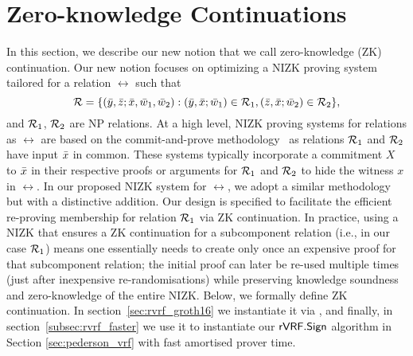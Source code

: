 


\section{Zero-knowledge Continuations}
\label{sec:rvrf_cont}
In this section, we describe our new notion that we call zero-knowledge (ZK) continuation. Our new notion focuses on optimizing a NIZK proving system tailored for a relation $ \rel $ such that
$$\mathcal{R} = \{(\bar{y}, \bar{z}; \bar{x}, \bar{w}_1, \bar{w}_2):  (\bar{y}, \bar{x}; \bar{w}_1) \in \mathcal{R}_1, (\bar{z}, \bar{x}; \bar{w}_2) \in \mathcal{R}_2 \},$$
and $\mathcal{R}_1$, $\mathcal{R}_2$ are NP relations. 
At a high level, NIZK proving systems for relations as $ \rel$ are based on the commit-and-prove methodology~\cite{Kilian1990UsesOR,CLOS02,LegoSNARK} 
as relations $\mathcal{R}_1$ and $\mathcal{R}_2$ have input $\bar{x}$ in common. These systems typically incorporate a commitment $X$ to $\bar{x}$ in their respective 
proofs or arguments for $ \mathcal{R}_1 $ and $ \mathcal{R}_2 $ to hide the witness $ x $ in $ \rel $. In our proposed NIZK system for $ \rel $, we adopt a similar methodology but with a distinctive addition. Our design is specified to facilitate the efficient re-proving membership for relation $\mathcal{R}_1$ via ZK continuation. 
In practice, using a NIZK that ensures a ZK continuation for a 
subcomponent relation (i.e., in our case $\mathcal{R}_1$) means one essentially needs to create only once an  expensive proof for that subcomponent 
relation; the initial proof can later be re-used multiple times (just after inexpensive re-randomisations) 
while preserving knowledge soundness and zero-knowledge of the entire NIZK. 
Below, we formally define ZK continuation. In section~\ref{sec:rvrf_groth16} we instantiate it via  \SpecialG, and finally, in section~\ref{subsec:rvrf_faster} we use it to instantiate our $ {\mathsf{rVRF}}.{\mathsf{Sign}} $ algorithm in Section \ref{sec:pederson_vrf} with fast amortised prover time. \\



